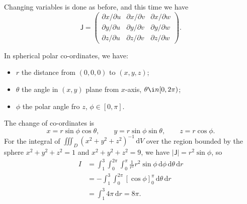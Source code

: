 \documentclass[letter-paper]{tufte-book}
\newenvironment{example}[1][Example]{\begin{trivlist}
\item[\hskip \labelsep {\bfseries #1}]}{\end{trivlist}}
\newcommand{\dy}{\partial}
\begin{document}
Changing variables is done as before, and this time we have
\begin{equation*}
  \boldsymbol{\mathsf{J}} = \begin{pmatrix}
    \dy x/\dy u & \dy x/\dy v & \dy x/\dy w \\
    \dy y/\dy u & \dy y/\dy v & \dy y/\dy w \\
    \dy z/\dy u & \dy z/\dy v & \dy z/\dy w
  \end{pmatrix}.
\end{equation*}
\begin{example}
  In spherical polar co-ordinates, we have:
  \begin{itemize}
    \item $r$ the distance from $(0,0,0)$ to $(x,y,z)$;
    \item $\theta$ the angle in $(x,y)$ plane from $x$-axis, $\theta \i n[0,
    2\pi)$;
    \item $\phi$ the polar angle fro $z$, $\phi\in [0,\pi]$.
  \end{itemize}
  The change of co-ordinates is
  \begin{equation*}
    x = r\sin\phi\cos\theta,\qquad y = r\sin\phi\sin\theta,\qquad z = r\cos\phi.
  \end{equation*}
  For the integral of $\iiint_D (x^2 + y^2 + z^2)^{-1}\, \mathrm{d}V$ over the
  region bounded by the sphere $x^2 + y^2 + z^2 = 1$ and $x^2 + y^2 + z^2 = 9$,
  we have $|\boldsymbol{\mathsf{J}}|=r^2\sin\phi$, so
  \begin{align*}
    I &= \int_1^3 \int_0^{2\pi} \int_0^\pi \frac{1}{r^2} r^2\sin\phi\, \mathrm{d}\phi\, \mathrm{d}\theta\, \mathrm{d}r\\
      &= -\int_1^3 \int_0^{2\pi} [\cos\phi]_0^\pi\,\mathrm{d}\theta\,\mathrm{d}r \\
      &= \int_1^3 4\pi\,\mathrm{d}r = 8\pi.
  \end{align*}
\end{example}








\mainmatter




%


\end{document}
